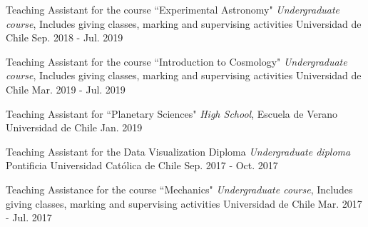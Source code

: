 

\begin{cvhonors}
	\cvhonor
	{Teaching Assistant for the course ``Experimental Astronomy"} %
	{\textit{Undergraduate course}, Includes giving classes, marking and supervising activities} %
	{Universidad de Chile} %
	{Sep. 2018 - Jul. 2019} %
	
	\cvhonor
	{Teaching Assistant for the course ``Introduction to Cosmology"} %
	{\textit{Undergraduate course}, Includes giving classes, marking and supervising activities} %
	{Universidad de Chile} %
	{Mar. 2019 - Jul. 2019} %
	
	\cvhonor
	{Teaching Assistant for ``Planetary Sciences"} %
	{\textit{High School}, Escuela de Verano} %
	{Universidad de Chile} %
	{Jan. 2019} %
	
	\cvhonor
	{Teaching Assistant for the Data Visualization Diploma} %
	{\textit{Undergraduate diploma}} %
	{Pontificia Universidad Cat\'olica de Chile} %
	{Sep. 2017 - Oct. 2017} %
	
	\cvhonor
	{Teaching Assistance for the course ``Mechanics"} %
	{\textit{Undergraduate course}, Includes giving classes, marking and supervising activities} %
	{Universidad de Chile} %
	{Mar. 2017 - Jul. 2017} %
	
\end{cvhonors}
